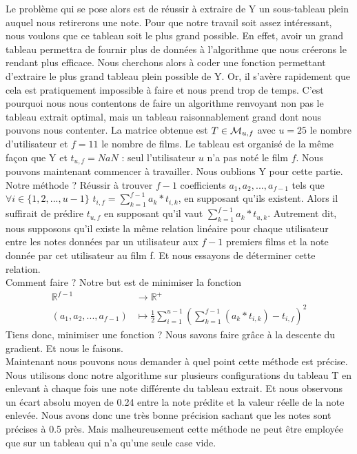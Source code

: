 \documentclass[a4paper,10pt]{article}
\begin{document}
Le problème qui se pose alors est de réussir à extraire de Y un sous-tableau plein auquel nous retirerons une note. Pour que notre travail soit assez intéressant, nous voulons que ce tableau soit le plus grand possible. En effet, avoir un grand tableau permettra de fournir plus de données à l'algorithme que nous créerons le rendant plus efficace. Nous cherchons alors à coder une fonction permettant d'extraire le plus grand tableau plein possible de Y. Or, il s'avère rapidement que cela est pratiquement impossible à faire et nous prend trop de temps. C'est pourquoi nous nous contentons de faire un algorithme renvoyant non pas le tableau extrait optimal, mais un tableau raisonnablement grand dont nous pouvons nous contenter. La matrice obtenue est $T \in {\cal M}_{u, f}$ avec $u = 25$ le nombre d'utilisateur et $f = 11$ le nombre de films. Le tableau est organisé de la même façon que Y et $t_{u, f} = NaN$ : seul l'utilisateur $u$ n'a pas noté le film $f$. Nous pouvons maintenant commencer à travailler. Nous oublions Y pour cette partie.\\

Notre méthode ? Réussir à trouver $f-1$ coefficients $a_1, a_2, ..., a_{f-1}$ tels que $\forall i \in \{1, 2, ..., u-1\}$ $t_{i, f} = \sum_{k = 1}^{f-1} a_k * t_{i, k}$, en supposant qu'ils existent. Alors il suffirait de prédire $t_{u, f}$ en supposant qu'il vaut $\sum_{k = 1}^{f-1} a_k * t_{u, k}$. Autrement dit, nous supposons qu'il existe la même relation linéaire pour chaque utilisateur entre les notes données par un utilisateur aux $f- 1$ premiers films et la note donnée par cet utilisateur au film f. Et nous essayons de déterminer cette relation.\\

Comment faire ? Notre but est de minimiser la fonction
\begin{align*}
\mathbb{R}^{f-1}&\longrightarrow \mathbb{R}^+\\ 
(a_1, a_2, ..., a_{f-1})&\longmapsto \frac{1}{2}\sum_{i = 1}^{u - 1} (\sum_{k = 1}^{f-1} (a_k * t_{i, k}) - t_{i, f})^2
\end{align*}
Tiens donc, minimiser une fonction ? Nous savons faire grâce à la descente du gradient. Et nous le faisons.\\

Maintenant nous pouvons nous demander à quel point cette méthode est précise. Nous utilisons donc notre algorithme sur plusieurs configurations du tableau T en enlevant à chaque fois une note différente du tableau extrait. Et nous observons un écart absolu moyen de 0.24 entre la note prédite et la valeur réelle de la note enlevée. Nous avons donc une très bonne précision sachant que les notes sont précises à 0.5 près. Mais malheureusement cette méthode ne peut être employée que sur un tableau qui n'a qu'une seule case vide.
\end{document}

